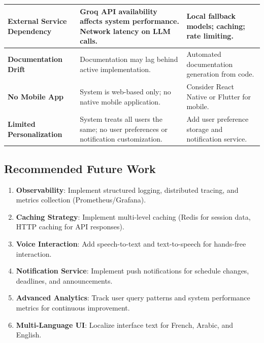 \begin{fig}[H]
\begin{center}
\begin{tabular}{|p{3.5cm}|p{5.5cm}|p{4cm}|}
\textbf{External Service Dependency} & 
Groq API availability affects system performance. Network latency on LLM calls. & 
Local fallback models; caching; rate limiting. \\
\hline

\textbf{Documentation Drift} & 
Documentation may lag behind active implementation. & 
Automated documentation generation from code. \\
\hline

\textbf{No Mobile App} & 
System is web-based only; no native mobile application. & 
Consider React Native or Flutter for mobile. \\
\hline

\textbf{Limited Personalization} & 
System treats all users the same; no user preferences or notification customization. & 
Add user preference storage and notification service. \\
\hline

\end{tabular}
\end{center}

\subsection{Recommended Future Work}

\begin{enumerate}
    \item \textbf{Observability}: Implement structured logging, distributed tracing, and metrics collection (Prometheus/Grafana).
    
    \item \textbf{Caching Strategy}: Implement multi-level caching (Redis for session data, HTTP caching for API responses).
        
    \item \textbf{Voice Interaction}: Add speech-to-text and text-to-speech for hands-free interaction.
    
    \item \textbf{Notification Service}: Implement push notifications for schedule changes, deadlines, and announcements.
    
    \item \textbf{Advanced Analytics}: Track user query patterns and system performance metrics for continuous improvement.
    
    \item \textbf{Multi-Language UI}: Localize interface text for French, Arabic, and English.
    

\end{enumerate}
\end{fig}
